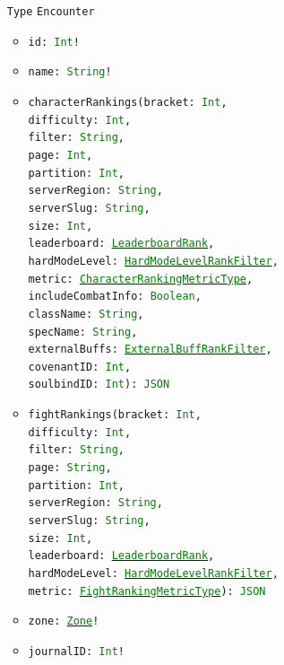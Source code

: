 \documentclass[10pt, a4paper]{memoir}
\numberwithin{equation}{section}
\theoremstyle{plain}
\theoremstyle{defp}
\theoremstyle{dotless}
\theoremstyle{definition}
\theoremstyle{dotless}
\theoremstyle{dotless}
\theoremstyle{defp}
\theoremstyle{defp}
\theoremstyle{be}          %
\theoremstyle{defp}
\newcommand\ttt[1]{\texttt{#1}}
\newcommand\type[1]{\ttt{\textcolor{green}{#1}}}
\begin{document}
\begin{itemize}[noitemsep,topsep=1pt]
	\item[\ttt{Type}] \ttt{Encounter}
	\begin{itemize}[itemsep=1pt,topsep=1pt]
		\item \ttt{id: \type{Int}!}
		\item \ttt{name: \type{String}!}
		\item \ttt{characterRankings(bracket: \type{Int}, \\difficulty: \type{Int}, \\filter: \type{String}, \\page: \type{Int}, \\partition: \type{Int}, \\serverRegion: \type{String}, \\serverSlug: \type{String}, \\size: \type{Int}, \\leaderboard: \hyperref[sec:LeaderboardRank]{\type{LeaderboardRank}}, \\hardModeLevel: \hyperref[sec:HardModeLevelRankFilter]{\type{HardModeLevelRankFilter}}, \\metric: \hyperref[sec:CharacterRankingMetricType]{\type{CharacterRankingMetricType}}, \\includeCombatInfo: \type{Boolean}, \\className: \type{String}, \\specName: \type{String}, \\externalBuffs: \hyperref[sec:ExternalBuffRankFilter]{\type{ExternalBuffRankFilter}}, \\covenantID: \type{Int}, \\soulbindID: \type{Int}): \type{JSON}}
		\item \ttt{fightRankings(bracket: \type{Int}, \\difficulty: \type{Int}, \\filter: \type{String}, \\page: \type{String}, \\partition: \type{Int}, \\serverRegion: \type{String}, \\serverSlug: \type{String}, \\size: \type{Int}, \\leaderboard: \hyperref[sec:LeaderboardRank]{\type{LeaderboardRank}}, \\hardModeLevel: \hyperref[sec:HardModeLevelRankFilter]{\type{HardModeLevelRankFilter}}, \\metric: \hyperref[sec:FightRankingMetricType]{\type{FightRankingMetricType}}): \type{JSON}}
		\item \ttt{zone: \hyperref[sec:Zone]{\type{Zone}}!}
		\item \ttt{journalID: \type{Int}!}
	\end{itemize}
\end{itemize}
\end{document}
